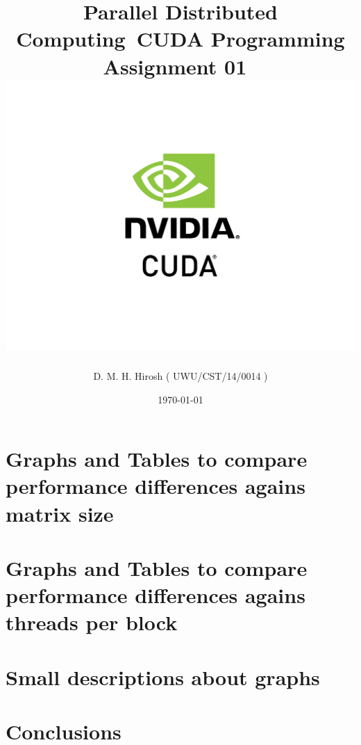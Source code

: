 \documentclass[12pt]{report}
\title{
		{Parallel Distributed Computing}\
		{\large CUDA Programming Assignment 01}\
		{\includegraphics[scale=0.5]{logo.jpg}}
	}
\author{D. M. H. Hirosh ( UWU/CST/14/0014 )}
\date{\today}
\begin{document}
	 
		\begin{titlepage}

		\maketitle
		\end{titlepage}

	\tableofcontents{}

		\chapter{Graphs and Tables to compare performance differences agains matrix size}
		

		\chapter{Graphs and Tables to compare performance differences agains threads per block}
		

		\chapter{Small descriptions about graphs}
		

		\chapter{Conclusions}
		

		
		
		
	 
	
\end{document}
